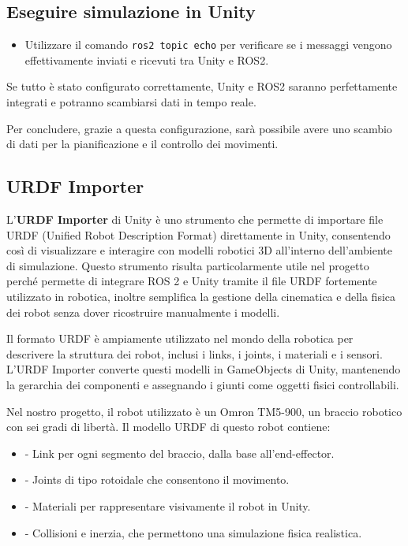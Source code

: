 \documentclass[11pt]{report}
\begin{document}
\subsection{Eseguire simulazione in Unity}
\begin{itemize}
    \item Utilizzare il comando \texttt{ros2 topic echo} per verificare se i messaggi vengono effettivamente inviati e ricevuti tra Unity e ROS2.
\end{itemize}

Se tutto è stato configurato correttamente, Unity e ROS2 saranno perfettamente integrati e potranno scambiarsi dati in tempo reale.

Per concludere, grazie a questa configurazione, sarà possibile avere uno scambio di dati per la pianificazione e il controllo dei movimenti.

\subsection{URDF Importer}

L'\textbf{URDF Importer} \cite{URDF-Importer} di Unity è uno strumento che permette di importare file URDF (Unified Robot Description Format) direttamente in Unity, consentendo così di visualizzare e interagire con modelli robotici 3D all'interno dell'ambiente di simulazione. Questo strumento risulta particolarmente utile nel progetto perché permette di integrare ROS 2 e Unity tramite il file URDF fortemente utilizzato in robotica, inoltre semplifica la gestione della cinematica e della fisica dei robot senza dover ricostruire manualmente i modelli.

Il formato URDF è ampiamente utilizzato nel mondo della robotica per descrivere la struttura dei robot, inclusi i links, i joints, i materiali e i sensori. L'URDF Importer converte questi modelli in GameObjects di Unity, mantenendo la gerarchia dei componenti e assegnando i giunti come oggetti fisici controllabili.

Nel nostro progetto, il robot utilizzato è un Omron TM5-900, un braccio robotico con sei gradi di libertà. Il modello URDF di questo robot contiene:
\begin{itemize}
    \item - Link per ogni segmento del braccio, dalla base all'end-effector.
    \item - Joints di tipo rotoidale che consentono il movimento.
    \item - Materiali per rappresentare visivamente il robot in Unity.
    \item - Collisioni e inerzia, che permettono una simulazione fisica realistica.
\end{itemize}
\end{document}
